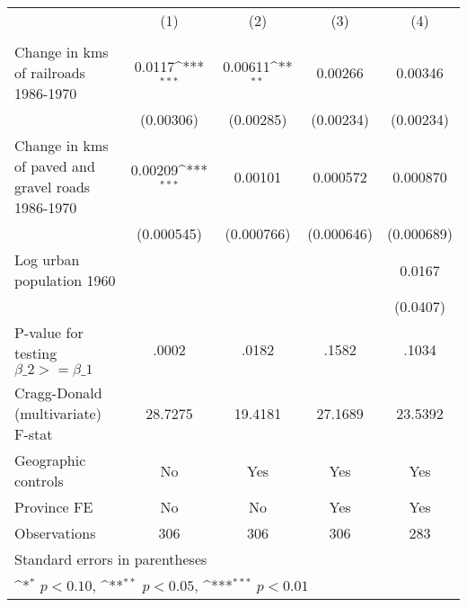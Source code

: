 {
\def\sym#1{\ifmmode^{#1}\else\(^{#1}\)\fi}
\begin{tabular}{l*{4}{c}}
\hline\hline
                &\multicolumn{1}{c}{(1)}&\multicolumn{1}{c}{(2)}&\multicolumn{1}{c}{(3)}&\multicolumn{1}{c}{(4)}\\
                &\multicolumn{1}{c}{}&\multicolumn{1}{c}{}&\multicolumn{1}{c}{}&\multicolumn{1}{c}{}\\
\hline
Change in kms of railroads 1986-1970&   0.0117\sym{***}&  0.00611\sym{**} &  0.00266         &  0.00346         \\
                &(0.00306)         &(0.00285)         &(0.00234)         &(0.00234)         \\
[1em]
Change in kms of paved and gravel roads 1986-1970&  0.00209\sym{***}&  0.00101         & 0.000572         & 0.000870         \\
                &(0.000545)         &(0.000766)         &(0.000646)         &(0.000689)         \\
[1em]
Log urban population 1960&                  &                  &                  &   0.0167         \\
                &                  &                  &                  & (0.0407)         \\
\hline
P-value for testing $\beta\_{2} >= \beta\_{1}$&    .0002         &    .0182         &    .1582         &    .1034         \\
Cragg-Donald (multivariate) F-stat&  28.7275         &  19.4181         &  27.1689         &  23.5392         \\
Geographic controls&       No         &      Yes         &      Yes         &      Yes         \\
Province FE     &       No         &       No         &      Yes         &      Yes         \\
Observations    &      306         &      306         &      306         &      283         \\
\hline\hline
\multicolumn{5}{l}{\footnotesize Standard errors in parentheses}\\
\multicolumn{5}{l}{\footnotesize \sym{*} \(p<0.10\), \sym{**} \(p<0.05\), \sym{***} \(p<0.01\)}\\
\end{tabular}
}
